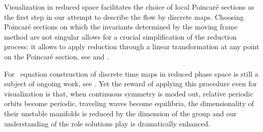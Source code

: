 Visualization in reduced space facilitates the choice of local Poincar\'e sections as the first step in
our attempt to describe the flow by discrete maps. Choosing Poincar\'e sections on which the invariants
determined by the moving frame method are not singular allows for a crucial simplification of the reduction
process: it allows to apply reduction through a linear transformation at any point on the Poincar\'e section,
see  and
. 

For \KS\ equation construction of discrete time maps in reduced phase space is still a subject of ongoing
work, see . Yet the reward of applying this procedure even for visualization 
is that, when continuous symmetry is moded out, relative periodic
orbits become periodic, traveling waves become equilibria, the dimensionality of their unstable manifolds
is reduced by the dimension of the group and our understanding of the role solutions play is dramatically
enhanced.
